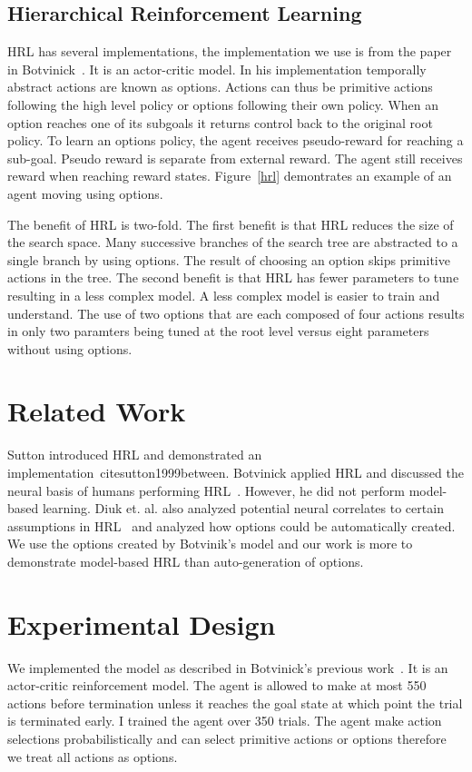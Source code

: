 \subsection{Hierarchical Reinforcement Learning}
HRL has several implementations, the implementation we use is from the paper in Botvinick~\cite{botvinick2009hierarchically}. It is an actor-critic model. In his implementation temporally abstract actions are known as options. Actions can thus be primitive actions following the high level policy or options following their own policy. When an option reaches one of its subgoals it returns control back to the original root policy. To learn an options policy, the agent receives pseudo-reward for reaching a sub-goal. Pseudo reward is separate from external reward. The agent still receives reward when reaching reward states. Figure~\ref{hrl} demontrates an example of an agent moving using options.

The benefit of HRL is two-fold. The first benefit is that HRL reduces the size of the search space. Many successive branches of the search tree are abstracted to a single branch by using options. The result of choosing an option skips primitive actions in the tree. The second benefit is that HRL has fewer parameters to tune resulting in a less complex model. A less complex model is easier to train and understand. The use of two options that are each composed of four actions results in only two paramters being tuned at the root level versus eight parameters without using options.

\section{Related Work}
Sutton introduced HRL and demonstrated an implementation~cite{sutton1999between}. Botvinick applied HRL and discussed the neural basis of humans performing HRL~\cite{botvinick2009hierarchically}. However, he did not perform model-based learning. Diuk et. al. also analyzed potential neural correlates to certain assumptions in HRL~\cite{diuk2013divide} and analyzed how options could be automatically created. We use the options created by Botvinik's model and our work is more to demonstrate model-based HRL than auto-generation of options.

\section{Experimental Design}
We implemented the model as described in Botvinick's previous work~\cite{botvinick2009hierarchically}. It is an actor-critic reinforcement model. The agent is allowed to make at most 550 actions before termination unless it reaches the goal state at which point the trial is terminated early. I trained the agent over 350 trials. The agent make action selections probabilistically and can select primitive actions or options therefore we treat all actions as options.

